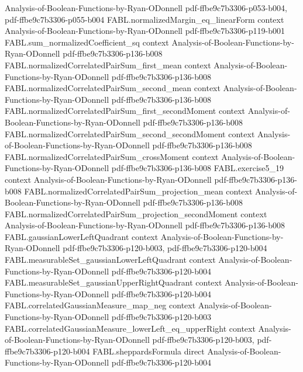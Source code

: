 \begin{theorem}
  {Analysis-of-Boolean-Functions-by-Ryan-ODonnell}
  {pdf-ffbe9c7b3306-p053-b004,
    pdf-ffbe9c7b3306-p055-b004}
\proofstep
  {FABL.normalizedMargin_eq_linearForm}
  {context}
  {Analysis-of-Boolean-Functions-by-Ryan-ODonnell}
  {pdf-ffbe9c7b3306-p119-b001}
\proofstep
  {FABL.sum_normalizedCoefficient_sq}
  {context}
  {Analysis-of-Boolean-Functions-by-Ryan-ODonnell}
  {pdf-ffbe9c7b3306-p136-b008}
\proofstep
  {FABL.normalizedCorrelatedPairSum_first_mean}
  {context}
  {Analysis-of-Boolean-Functions-by-Ryan-ODonnell}
  {pdf-ffbe9c7b3306-p136-b008}
\proofstep
  {FABL.normalizedCorrelatedPairSum_second_mean}
  {context}
  {Analysis-of-Boolean-Functions-by-Ryan-ODonnell}
  {pdf-ffbe9c7b3306-p136-b008}
\proofstep
  {FABL.normalizedCorrelatedPairSum_first_secondMoment}
  {context}
  {Analysis-of-Boolean-Functions-by-Ryan-ODonnell}
  {pdf-ffbe9c7b3306-p136-b008}
\proofstep
  {FABL.normalizedCorrelatedPairSum_second_secondMoment}
  {context}
  {Analysis-of-Boolean-Functions-by-Ryan-ODonnell}
  {pdf-ffbe9c7b3306-p136-b008}
\proofstep
  {FABL.normalizedCorrelatedPairSum_crossMoment}
  {context}
  {Analysis-of-Boolean-Functions-by-Ryan-ODonnell}
  {pdf-ffbe9c7b3306-p136-b008}
\proofstep
  {FABL.exercise5_19}
  {context}
  {Analysis-of-Boolean-Functions-by-Ryan-ODonnell}
  {pdf-ffbe9c7b3306-p136-b008}
\proofstep
  {FABL.normalizedCorrelatedPairSum_projection_mean}
  {context}
  {Analysis-of-Boolean-Functions-by-Ryan-ODonnell}
  {pdf-ffbe9c7b3306-p136-b008}
\proofstep
  {FABL.normalizedCorrelatedPairSum_projection_secondMoment}
  {context}
  {Analysis-of-Boolean-Functions-by-Ryan-ODonnell}
  {pdf-ffbe9c7b3306-p136-b008}
\proofstep
  {FABL.gaussianLowerLeftQuadrant}
  {context}
  {Analysis-of-Boolean-Functions-by-Ryan-ODonnell}
  {pdf-ffbe9c7b3306-p120-b003,
    pdf-ffbe9c7b3306-p120-b004}
\proofstep
  {FABL.measurableSet_gaussianLowerLeftQuadrant}
  {context}
  {Analysis-of-Boolean-Functions-by-Ryan-ODonnell}
  {pdf-ffbe9c7b3306-p120-b004}
\proofstep
  {FABL.measurableSet_gaussianUpperRightQuadrant}
  {context}
  {Analysis-of-Boolean-Functions-by-Ryan-ODonnell}
  {pdf-ffbe9c7b3306-p120-b004}
\proofstep
  {FABL.correlatedGaussianMeasure_map_neg}
  {context}
  {Analysis-of-Boolean-Functions-by-Ryan-ODonnell}
  {pdf-ffbe9c7b3306-p120-b003}
\proofstep
  {FABL.correlatedGaussianMeasure_lowerLeft_eq_upperRight}
  {context}
  {Analysis-of-Boolean-Functions-by-Ryan-ODonnell}
  {pdf-ffbe9c7b3306-p120-b003,
    pdf-ffbe9c7b3306-p120-b004}
\proofstep
  {FABL.sheppardsFormula}
  {direct}
  {Analysis-of-Boolean-Functions-by-Ryan-ODonnell}
  {pdf-ffbe9c7b3306-p120-b004}
\proofstep

\end{theorem}
